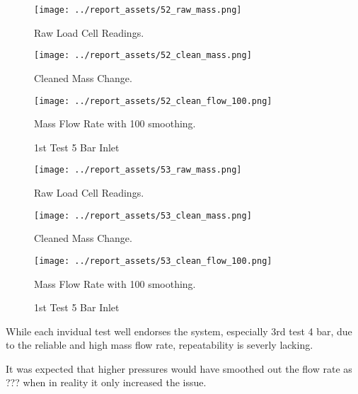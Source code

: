 \begin{figure}[htbp]
    \centering

    \begin{minipage}{0.3\textwidth}
        \centering
        \texttt{[image: ../report\_assets/52\_raw\_mass.png]}
        \caption*{Raw Load Cell Readings.}
    \end{minipage}
    \hfill
    \begin{minipage}{0.3\textwidth}
        \centering
        \texttt{[image: ../report\_assets/52\_clean\_mass.png]}
        \caption*{Cleaned Mass Change.}
    \end{minipage}
    \hfill
    \begin{minipage}{0.3\textwidth}
        \centering
        \texttt{[image: ../report\_assets/52\_clean\_flow\_100.png]}
        \caption*{Mass Flow Rate with 100 smoothing.}
    \end{minipage}
    \caption{1st Test 5 Bar Inlet}
    
\end{figure}\label{fig:52}

\begin{figure}[htbp]
    \centering

    \begin{minipage}{0.3\textwidth}
        \centering
        \texttt{[image: ../report\_assets/53\_raw\_mass.png]}
        \caption*{Raw Load Cell Readings.}
    \end{minipage}
    \hfill
    \begin{minipage}{0.3\textwidth}
        \centering
        \texttt{[image: ../report\_assets/53\_clean\_mass.png]}
        \caption*{Cleaned Mass Change.}
    \end{minipage}
    \hfill
    \begin{minipage}{0.3\textwidth}
        \centering
        \texttt{[image: ../report\_assets/53\_clean\_flow\_100.png]}
        \caption*{Mass Flow Rate with 100 smoothing.}
    \end{minipage}
    \caption{1st Test 5 Bar Inlet}
    
\end{figure}\label{fig:53}

While each invidual test well endorses the system, especially 3rd test 4 bar, due to the reliable and high mass flow rate, repeatability is severly lacking.

It was expected that higher pressures would have smoothed out the flow rate as ??? when in reality it only increased the issue. 